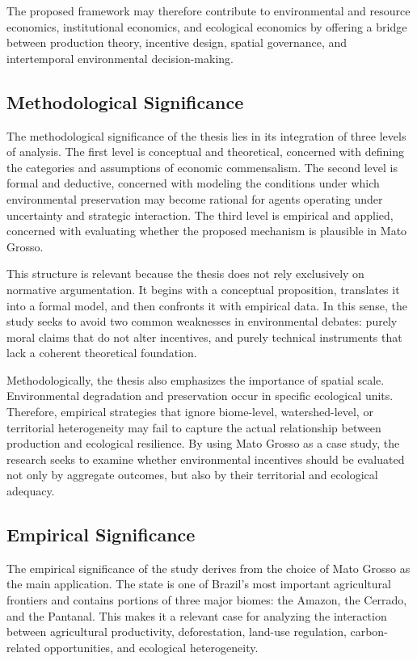 The proposed framework may therefore contribute to environmental and resource economics, institutional economics, and ecological economics by offering a bridge between production theory, incentive design, spatial governance, and intertemporal environmental decision-making.

\subsection{Methodological Significance}

The methodological significance of the thesis lies in its integration of three levels of analysis. The first level is conceptual and theoretical, concerned with defining the categories and assumptions of economic commensalism. The second level is formal and deductive, concerned with modeling the conditions under which environmental preservation may become rational for agents operating under uncertainty and strategic interaction. The third level is empirical and applied, concerned with evaluating whether the proposed mechanism is plausible in Mato Grosso.

This structure is relevant because the thesis does not rely exclusively on normative argumentation. It begins with a conceptual proposition, translates it into a formal model, and then confronts it with empirical data. In this sense, the study seeks to avoid two common weaknesses in environmental debates: purely moral claims that do not alter incentives, and purely technical instruments that lack a coherent theoretical foundation.

Methodologically, the thesis also emphasizes the importance of spatial scale. Environmental degradation and preservation occur in specific ecological units. Therefore, empirical strategies that ignore biome-level, watershed-level, or territorial heterogeneity may fail to capture the actual relationship between production and ecological resilience. By using Mato Grosso as a case study, the research seeks to examine whether environmental incentives should be evaluated not only by aggregate outcomes, but also by their territorial and ecological adequacy.

\subsection{Empirical Significance}

The empirical significance of the study derives from the choice of Mato Grosso as the main application. The state is one of Brazil's most important agricultural frontiers and contains portions of three major biomes: the Amazon, the Cerrado, and the Pantanal. This makes it a relevant case for analyzing the interaction between agricultural productivity, deforestation, land-use regulation, carbon-related opportunities, and ecological heterogeneity.

